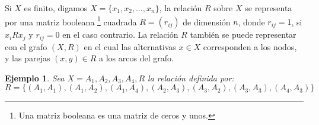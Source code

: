 \documentclass[a5paper,doc,10pt,noapacite]{apa6}
\newtheorem{ejem}{Ejemplo}
\begin{document}
{{Si \(X\) es finito, digamos \(X = \{x_1, x_2, \dots , x_n \}\), la relación \(R\) sobre \(X\) se representa por una matriz booleana \footnote{Una matriz booleana es una matriz de ceros y unos.} cuadrada \(R = (r_{ij})\) de dimensión \(n\), donde \(r_{ij} = 1\), si \(x_i R x_j \text{ y } r_{ij} = 0\) en el caso contrario. La relación \(R\) también se puede representar con el grafo \((X,R)\) en el cual las alternativas \(x \in X\) corresponden a los nodos, y las parejas \((x,y) \in R\) a los arcos del grafo.

%
\begin{ejem}

Sea \(X = {A_1, A_2, A_3, A_4}, R\) la relación definida por:
\[
	R = \big\{		(A_1, A_1),(A_1, A_2),(A_1, A_4),(A_2, A_3),(A_3,A_2),(A_3, A_3),(A_4,A_3) \big\}
\]

\begin{figure}
\begin{floatrow}
	\fontsize{7}{11}\selectfont
	\captionsetup{justification=centering, labelfont=footnotesize, font=footnotesize}
\end{floatrow}
\end{figure}
%
\end{ejem}

}}
\end{document}

